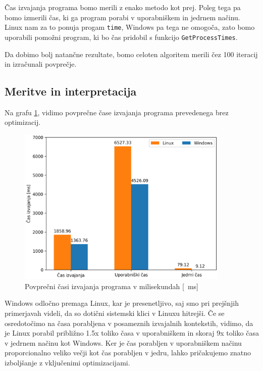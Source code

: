 \documentclass[a4paper,12pt,openright]{book}
\begin{document}
Čas izvajanja programa bomo merili z enako metodo kot prej.
Poleg tega pa bomo izmerili čas, ki ga program porabi v uporabniškem in jedrnem načinu.
Linux nam za to ponuja progam \texttt{time}, Windows pa tega ne omogoča, zato bomo uporabili pomožni program, ki bo čas pridobil s funkcijo \texttt{GetProcessTimes}.

Da dobimo bolj natančne rezultate, bomo celoten algoritem merili čez 100 iteracij in izračunali povprečje.

\subsection{Meritve in interpretacija}

Na grafu \ref{fig:program_comparison:times}, vidimo povprečne čase izvajanja programa prevedenega brez optimizacij.

\begin{figure}[h!]
	\begin{center}
		\includegraphics[width=0.9\textwidth]{images/program_comparison.png}
	\end{center}
	\caption{Povprečni časi izvajanja programa v milisekundah [\SI{}{\milli\second}]}
	\label{fig:program_comparison:times}
\end{figure}

Windows odločno premaga Linux, kar je presenetljivo, saj smo pri prejšnjih primerjavah videli, da so dotični sistemski klici v Linuxu hitrejši.
Če se osredotočimo na časa porabljena v posameznih izvajalnih kontekstih, vidimo, da je Linux porabil približno 1.5x toliko časa v uporabniškem in skoraj 9x toliko časa v jedrnem načinu kot Windows.
Ker je čas porabljen v uporabniškem načinu proporcionalno veliko večji kot čas porabljen v jedru, lahko pričakujemo znatno izboljšanje z vključenimi optimizacijami.
\end{document}
